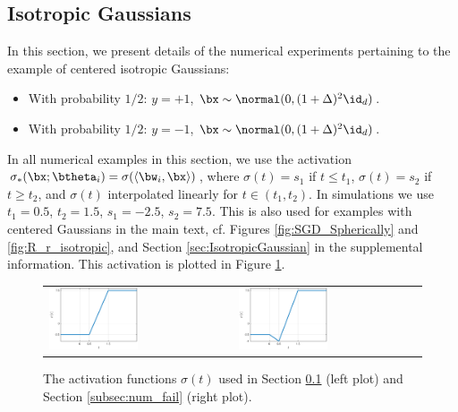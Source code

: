 \documentclass[11pt]{article}
\begin{document}
\subsection{Isotropic Gaussians} \label{subsec:num_iso}
In this section, we present details of the numerical experiments pertaining to the example of centered isotropic Gaussians:
\begin{itemize}	
	\item[] With probability $1/2$: $y=+1$, $\bx\sim\normal(0,(1+\Delta)^2\id_d)$.
	\item[] With probability $1/2$: $y=-1$, $\bx\sim\normal(0,(1+\Delta)^2\id_d)$.	
\end{itemize}
In all numerical examples in this section, we use the activation $\sigma_*(\bx;\btheta_i) = \sigma(\langle\bw_i,\bx\rangle)$, where 
$\sigma(t) = s_1$ if $t\le t_1$, $\sigma(t) = s_2$ if $t\ge t_2$, and $\sigma(t)$ interpolated linearly for $t\in (t_1,t_2)$.
In simulations we use $t_1 = 0.5$, $t_2=1.5$, $s_1=-2.5$, $s_2=7.5$. This is also used for examples with centered Gaussians in the main text, cf. Figures \ref{fig:SGD_Spherically} and \ref{fig:R_r_isotropic}, and Section \ref{sec:IsotropicGaussian} in the supplemental information. This activation is plotted in Figure \ref{fig:num_sigmoid}. 

\begin{figure}[]
	\begin{center}
		\begin{tabular}{ll}
			\includegraphics[width=0.5\textwidth]{flat_sigmoid.eps}
			&
			\includegraphics[width=0.5\textwidth]{fail_sigmoid.eps}
		\end{tabular}
	\end{center}
	\caption{The activation functions $\sigma(t)$ used in Section \ref{subsec:num_iso} (left plot) and Section \ref{subsec:num_fail} (right plot).}
	\label{fig:num_sigmoid}
\end{figure}
\end{document}
